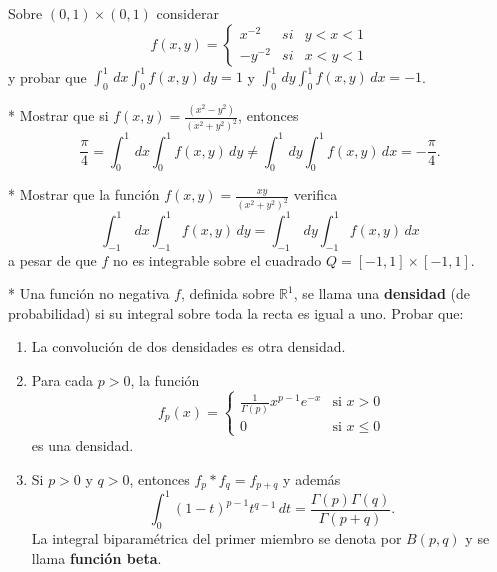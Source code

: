 \documentclass{book}
\newcommand{\rr}{\mathbb{R}}
\begin{document}
\begin{ejer}{}
Sobre $(0,1)\times (0,1)$ considerar
\[
f(x,y)=\left\{
\begin{array}{rll}
x^{-2}&si&y<x<1
\\
-y^{-2}&si&x<y<1
\end{array}
\right.
\]
y probar que $\int_0^1\,dx\int_0^1 f(x,y)\,dy=1$ y $\int_0^1\,dy \int_0^1 f(x,y)\,dx=-1$.
\end{ejer}

\begin{ejer}{}*
 Mostrar que si $f(x,y)=\frac{(x^2-y^2)}{(x^2+y^2)^2}$, entonces
     $$\frac{\pi}{4}=\int_0^1 \,dx\int_0^1 f(x,y)\,dy\not = \int_0^1\,dy \int_0^1 f(x,y)\,dx=-\frac{\pi}{4}. $$
\end{ejer}

 \begin{ejer}{}* Mostrar que la función $f(x,y)=\frac{xy}{(x^2+y^2)^2}$ verifica
   $$\int_{-1}^1 \,dx\int_{-1}^1 f(x,y)\,dy=\int_{-1}^1\,dy \int_{-1}^1 f(x,y)\,dx $$
   a pesar de que $f$ no es integrable sobre el cuadrado $Q=[-1,1]\times [-1,1]$.
	\end{ejer}

 
\begin{ejer}{}* Una función no negativa $f$, definida sobre $\rr^1$, se llama una {\bf{densidad}}
   (de probabilidad) si su integral sobre toda la recta es igual a uno. Probar que: 
	\begin{enumerate}
	\item La convolución de dos densidades es otra densidad.
	\item Para cada $p>0$, la función 
     $$f_p(x)=\left\{ 
      \begin{array}{cc}
      \frac{1}{\Gamma(p)} x^{p-1} e^{-x} & \mbox{si $x>0$}\\
      0 & \mbox{si $x \leq 0$}
      \end{array}
      \right. $$
      es una densidad.
	 \item Si $p>0$ y $q>0$, entonces $f_p*f_q=f_{p+q}$ y además
      $$\int_0^1 (1-t)^{p-1} t^{q-1}\,dt=\frac{\Gamma(p) \Gamma(q)}{\Gamma(p+q)}. $$
      La integral biparamétrica del primer miembro se denota por $B(p,q)$ y se llama 
      {\bf{función beta}}.
	\end{enumerate}
	
\end{ejer}




	
	
	
	


\end{document}
